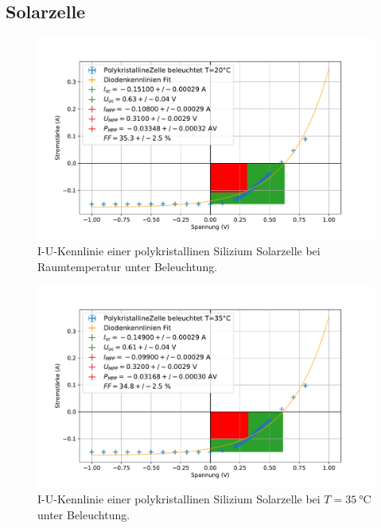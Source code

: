 \documentclass[
	a4paper,
	12pt,
	pagesize,
	ngerman
]{scrartcl}
\begin{document}
	\subsection{Solarzelle}
	\begin{figure}[H]
			\includegraphics[width=.9\linewidth]{img/PolykristallineZelle_beleuchtet_20.pdf}
			\caption{
				I-U-Kennlinie einer polykristallinen Silizium Solarzelle bei Raumtemperatur unter Beleuchtung.
								}
			\label{fig_poly_beleuchtet_20}
	\end{figure}
	\begin{figure}[H]
			\includegraphics[width=.9\linewidth]{img/PolykristallineZelle_beleuchtet_35.pdf}
			\caption{
				I-U-Kennlinie einer polykristallinen Silizium Solarzelle bei $T=\SI{35}{\celsius}$ unter Beleuchtung.
								}
			\label{fig_poly_beleuchtet_35}
	\end{figure}
\end{document}
